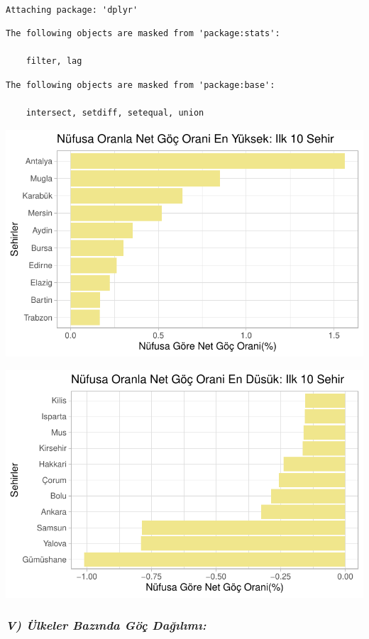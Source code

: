 \documentclass[
  11pt,
  a4paper,
  DIV=11,
  numbers=noendperiod]{scrartcl}
\begin{document}
\begin{verbatim}

Attaching package: 'dplyr'
\end{verbatim}

\begin{verbatim}
The following objects are masked from 'package:stats':

    filter, lag
\end{verbatim}

\begin{verbatim}
The following objects are masked from 'package:base':

    intersect, setdiff, setequal, union
\end{verbatim}

\includegraphics{project_files/figure-pdf/unnamed-chunk-6-1.pdf}

\includegraphics{project_files/figure-pdf/unnamed-chunk-6-2.pdf}

\subsubsection{\texorpdfstring{\emph{V) Ülkeler Bazında Göç
Dağılımı:}}{V) Ülkeler Bazında Göç Dağılımı:}}\label{v-uxfclkeler-bazux131nda-guxf6uxe7-daux11fux131lux131mux131}
\end{document}
